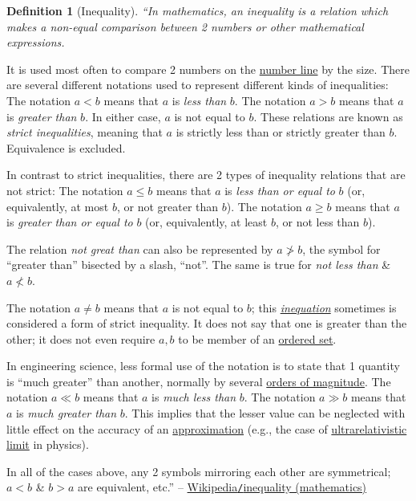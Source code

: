 \documentclass{article}
\newtheorem{definition}{Definition}
\begin{document}
\begin{definition}[Inequality]
	``In mathematics, an \emph{inequality} is a relation which makes a non-equal comparison between 2 numbers or other mathematical expressions.
\end{definition}
It is used most often to compare 2 numbers on the \href{https://en.wikipedia.org/wiki/Number_line}{number line} by the size. There are several different notations used to represent different kinds of inequalities: The notation $a < b$ means that $a$ is \textit{less than} $b$. The notation $a > b$ means that $a$ is \textit{greater than} $b$. In either case, $a$ is not equal to $b$. These relations are known as \textit{strict inequalities}, meaning that $a$ is strictly less than or strictly greater than $b$. Equivalence is excluded.

In contrast to strict inequalities, there are 2 types of inequality relations that are not strict: The notation $a\le b$ means that $a$ is \textit{less than or equal to} $b$ (or, equivalently, at most $b$, or not greater than $b$). The notation $a\ge b$ means that $a$ is \textit{greater than or equal to} $b$ (or, equivalently, at least $b$, or not less than $b$).

The relation \textit{not great than} can also be represented by $a\not > b$, the symbol for ``greater than'' bisected by a slash, ``not''. The same is true for \textit{not less than} \& $a\not < b$.

The notation $a\ne b$ means that $a$ is not equal to $b$; this \href{https://en.wikipedia.org/wiki/Inequation}{\textit{inequation}} sometimes is considered a form of strict inequality. It does not say that one is greater than the other; it does not even require $a,b$  to be member of an \href{https://en.wikipedia.org/wiki/Ordered_set}{ordered set}.

In engineering science, less formal use of the notation is to state that 1 quantity is ``much greater'' than another, normally by several \href{https://en.wikipedia.org/wiki/Order_of_magnitude}{orders of magnitude}. The notation $a\ll b$ means that $a$ is \textit{much less than} $b$. The notation $a\gg b$ means that $a$ is \textit{much greater than} $b$. This implies that the lesser value can be neglected with little effect on the accuracy of an \href{https://en.wikipedia.org/wiki/Approximation}{approximation} (e.g., the case of \href{https://en.wikipedia.org/wiki/Ultrarelativistic_limit}{ultrarelativistic limit} in physics).

In all of the cases above, any 2 symbols mirroring each other are symmetrical; $a < b$ \& $b > a$ are equivalent, etc.'' -- \href{https://en.wikipedia.org/wiki/Inequality_(mathematics)}{Wikipedia\texttt{/}inequality (mathematics)}
\end{document}
